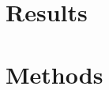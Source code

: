 \documentclass[a4paper, twoculumn]{article}
\begin{document}

\twocolumn
\section*{Results}



\section*{Methods}



\end{document}
